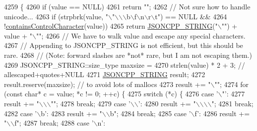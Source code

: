 \begin{DoxyCode}
4259                                                       \{
4260   \textcolor{keywordflow}{if} (value == NULL)
4261     \textcolor{keywordflow}{return} \textcolor{stringliteral}{""};
4262   \textcolor{comment}{// Not sure how to handle unicode...}
4263   \textcolor{keywordflow}{if} (strpbrk(value, \textcolor{stringliteral}{"\(\backslash\)"\(\backslash\)\(\backslash\)\(\backslash\)b\(\backslash\)f\(\backslash\)n\(\backslash\)r\(\backslash\)t"}) == NULL &&
4264       !\hyperlink{namespace_json_aa11b210ff98a4f4dd4e2df19260f8c3a}{containsControlCharacter}(value))
4265     \textcolor{keywordflow}{return} \hyperlink{json-forwards_8h_a1e723f95759de062585bc4a8fd3fa4be}{JSONCPP\_STRING}(\textcolor{stringliteral}{"\(\backslash\)""}) + value + \textcolor{stringliteral}{"\(\backslash\)""};
4266   \textcolor{comment}{// We have to walk value and escape any special characters.}
4267   \textcolor{comment}{// Appending to JSONCPP\_STRING is not efficient, but this should be rare.}
4268   \textcolor{comment}{// (Note: forward slashes are *not* rare, but I am not escaping them.)}
4269   JSONCPP\_STRING::size\_type maxsize =
4270       strlen(value) * 2 + 3; \textcolor{comment}{// allescaped+quotes+NULL}
4271   \hyperlink{json-forwards_8h_a1e723f95759de062585bc4a8fd3fa4be}{JSONCPP\_STRING} result;
4272   result.reserve(maxsize); \textcolor{comment}{// to avoid lots of mallocs}
4273   result += \textcolor{stringliteral}{"\(\backslash\)""};
4274   \textcolor{keywordflow}{for} (\textcolor{keyword}{const} \textcolor{keywordtype}{char}* c = value; *c != 0; ++c) \{
4275     \textcolor{keywordflow}{switch} (*c) \{
4276     \textcolor{keywordflow}{case} \textcolor{charliteral}{'\(\backslash\)"'}:
4277       result += \textcolor{stringliteral}{"\(\backslash\)\(\backslash\)\(\backslash\)""};
4278       \textcolor{keywordflow}{break};
4279     \textcolor{keywordflow}{case} \textcolor{charliteral}{'\(\backslash\)\(\backslash\)'}:
4280       result += \textcolor{stringliteral}{"\(\backslash\)\(\backslash\)\(\backslash\)\(\backslash\)"};
4281       \textcolor{keywordflow}{break};
4282     \textcolor{keywordflow}{case} \textcolor{charliteral}{'\(\backslash\)b'}:
4283       result += \textcolor{stringliteral}{"\(\backslash\)\(\backslash\)b"};
4284       \textcolor{keywordflow}{break};
4285     \textcolor{keywordflow}{case} \textcolor{charliteral}{'\(\backslash\)f'}:
4286       result += \textcolor{stringliteral}{"\(\backslash\)\(\backslash\)f"};
4287       \textcolor{keywordflow}{break};
4288     \textcolor{keywordflow}{case} \textcolor{charliteral}{'\(\backslash\)n'}:

\end{DoxyCode}
